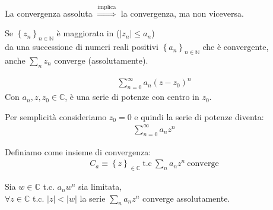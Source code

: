 \documentclass[a4paper, oneside]{article}
\begin{document}
    \begin{theorem}
        La convergenza assoluta $\overset{\text{implica}}{\Rightarrow}$ la convergenza, ma non viceversa.
    \end{theorem}
    \begin{theorem}
        Se $\left\{z_n\right\} _{n \in \mathbb{N}}$ è maggiorata in  ($|z_n| \leq a_n$)\\
        da una successione di numeri reali positivi $\left\{a_n\right\} _{n \in \mathbb{N}}$ che è convergente, \\
         anche $\sum_n z_n$ converge (assolutamente).\\
    \end{theorem}
    \begin{proposition}
        \begin{gather*}
            \sum_{n=0}^{\infty} a_n (z - z_0)^n
        \end{gather*}
        Con $a_n, z, z_0 \in \mathbb{C}$, è una serie di potenze con centro in $z_0$.\\
    \end{proposition}
    Per semplicità consideriamo $z_0 = 0$ e quindi la serie di potenze diventa:
    \begin{gather*}
    \sum_{n=0}^{\infty} a_n z^n
    \end{gather*}
    \begin{definition}
        Definiamo come insieme di convergenza:
        \begin{gather*}
            C_a \equiv \left\{ z \right\}_{\in \mathbb{C}} \ \text{t.c} \ \sum_n a_n z^n \ \text{converge}
        \end{gather*}
    \end{definition}
    \begin{lemma}[Di Abel]
        Sia $w \in \mathbb{C}$ t.c. $a_n w^n$ sia limitata, \\
        $\forall z \in \mathbb{C}$ t.c. $|z| < |w|$ la serie $\sum_n a_n z^n$ converge assolutamente.
    \end{lemma}
    \begin{center}
    \end{center}
\end{document}
